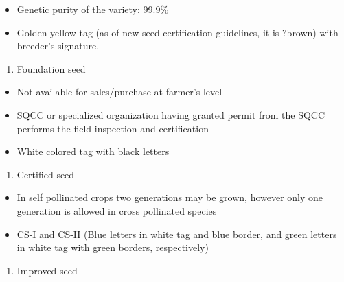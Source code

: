 \documentclass[
  openany]{book}
\providecommand{\tightlist}{%
  \setlength{\itemsep}{0pt}\setlength{\parskip}{0pt}}
\begin{document}
\begin{itemize}
\tightlist
\item
  Genetic purity of the variety: 99.9\%
\item
  Golden yellow tag (as of new seed certification guidelines, it is ?brown) with breeder's signature.
\end{itemize}

\begin{enumerate}
\def\labelenumi{\arabic{enumi}.}
\setcounter{enumi}{1}
\tightlist
\item
  Foundation seed
\end{enumerate}

\begin{itemize}
\tightlist
\item
  Not available for sales/purchase at farmer's level
\item
  SQCC or specialized organization having granted permit from the SQCC performs the field inspection and certification
\item
  White colored tag with black letters
\end{itemize}

\begin{enumerate}
\def\labelenumi{\arabic{enumi}.}
\setcounter{enumi}{1}
\tightlist
\item
  Certified seed
\end{enumerate}

\begin{itemize}
\tightlist
\item
  In self pollinated crops two generations may be grown, however only one generation is allowed in cross pollinated species
\item
  CS-I and CS-II (Blue letters in white tag and blue border, and green letters in white tag with green borders, respectively)
\end{itemize}

\begin{enumerate}
\def\labelenumi{\arabic{enumi}.}
\setcounter{enumi}{2}
\tightlist
\item
  Improved seed
\end{enumerate}
\end{document}
